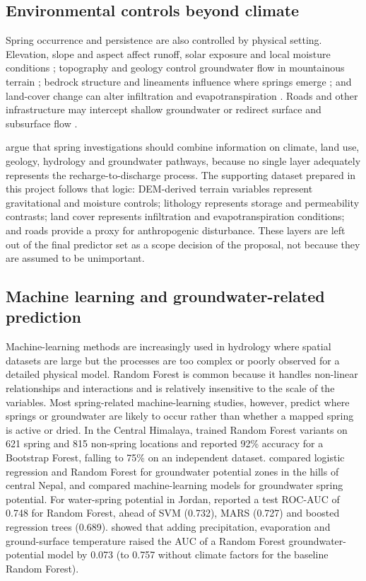 \documentclass[12pt,a4paper]{article}
\begin{document}
\subsection{Environmental controls beyond climate}\label{sec:lit-controls}

Spring occurrence and persistence are also controlled by physical setting. Elevation, slope and aspect affect runoff, solar exposure and local moisture conditions \citep{broxton2009,gutierrez2013}; topography and geology control groundwater flow in mountainous terrain \citep{forster1988,condon2015}; bedrock structure and lineaments influence where springs emerge \citep{doctor2008,ra2018}; and land-cover change can alter infiltration and evapotranspiration \citep{jayawickreme2007,bosmans2017,pant2026}. Roads and other infrastructure may intercept shallow groundwater or redirect surface and subsurface flow \citep{montgomery1994,dutton2005}.

\citet{chinnasamy2016} argue that spring investigations should combine information on climate, land use, geology, hydrology and groundwater pathways, because no single layer adequately represents the recharge-to-discharge process. The supporting dataset prepared in this project follows that logic: DEM-derived terrain variables represent gravitational and moisture controls; lithology represents storage and permeability contrasts; land cover represents infiltration and evapotranspiration conditions; and roads provide a proxy for anthropogenic disturbance. These layers are left out of the final predictor set as a scope decision of the proposal, not because they are assumed to be unimportant.

\subsection{Machine learning and groundwater-related prediction}\label{sec:lit-ml}

Machine-learning methods are increasingly used in hydrology where spatial datasets are large but the processes are too complex or poorly observed for a detailed physical model. Random Forest \citep{breiman2001} is common because it handles non-linear relationships and interactions and is relatively insensitive to the scale of the variables. Most spring-related machine-learning studies, however, predict where springs or groundwater are likely to occur rather than whether a mapped spring is active or dried. In the Central Himalaya, \citet{niraula2021} trained Random Forest variants on 621 spring and 815 non-spring locations and reported 92\% accuracy for a Bootstrap Forest, falling to 75\% on an independent dataset. \citet{pradhan2025} compared logistic regression and Random Forest for groundwater potential zones in the hills of central Nepal, and \citet{alfugara2020} compared machine-learning models for groundwater spring potential. For water-spring potential in Jordan, \citet{alshabeeb2023} reported a test ROC-AUC of 0.748 for Random Forest, ahead of SVM (0.732), MARS (0.727) and boosted regression trees (0.689). \citet{guo2023} showed that adding precipitation, evaporation and ground-surface temperature raised the AUC of a Random Forest groundwater-potential model by 0.073 (to 0.757 without climate factors for the baseline Random Forest).
\end{document}

